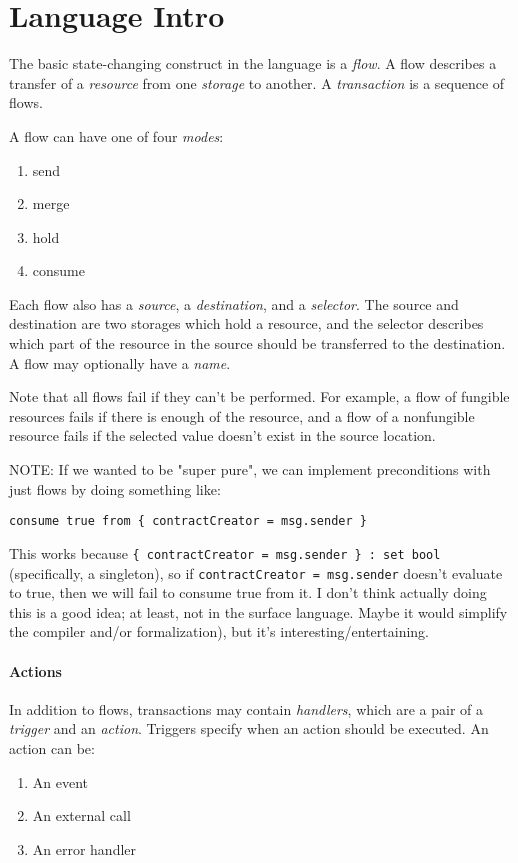 \documentclass[10pt]{article}
\begin{document}
\section{Language Intro}

The basic state-changing construct in the language is a \emph{flow}.
A flow describes a transfer of a \emph{resource} from one \emph{storage} to another.
A \emph{transaction} is a sequence of flows. 

A flow can have one of four \emph{modes}:
\begin{enumerate}
    \item send
    \item merge
    \item hold
    \item consume
\end{enumerate}

Each flow also has a \emph{source}, a \emph{destination}, and a \emph{selector}.
The source and destination are two storages which hold a resource, and the selector describes which part of the resource in the source should be transferred to the destination.
A flow may optionally have a \emph{name}.

Note that all flows fail if they can't be performed.
For example, a flow of fungible resources fails if there is enough of the resource, and a flow of a nonfungible resource fails if the selected value doesn't exist in the source location.

NOTE: If we wanted to be "super pure", we can implement preconditions with just flows by doing something like:
\begin{lstlisting}
consume true from { contractCreator = msg.sender }
\end{lstlisting}
This works because \lstinline|{ contractCreator = msg.sender } : set bool| (specifically, a singleton), so if \lstinline{contractCreator = msg.sender} doesn't evaluate to true, then we will fail to consume true from it.
I don't think actually doing this is a good idea; at least, not in the surface language.
Maybe it would simplify the compiler and/or formalization), but it's interesting/entertaining.

\paragraph{Actions}
In addition to flows, transactions may contain \emph{handlers}, which are a pair of a \emph{trigger} and an \emph{action}.
Triggers specify when an action should be executed.
An action can be:
\begin{enumerate}
    \item An event
    \item An external call
    \item An error handler
\end{enumerate}
\end{document}
